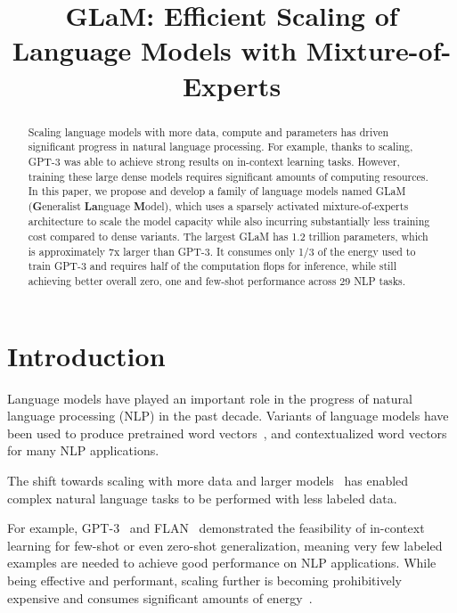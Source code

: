 \title{GLaM: Efficient Scaling of Language Models with Mixture-of-Experts}

\begin{abstract}
Scaling language models with more data, compute and parameters has driven significant progress in natural language processing. For example, thanks to scaling, GPT-3 was able to achieve strong results on in-context learning  tasks. However, training these large dense models requires significant amounts of computing resources. In this paper, we propose and develop a family of language models named GLaM (\textbf{G}eneralist \textbf{La}nguage \textbf{M}odel), which uses a sparsely activated mixture-of-experts architecture to scale the model capacity while also incurring substantially less training cost compared to dense variants. The largest GLaM has 1.2 trillion parameters, which is approximately 7x larger than GPT-3. It consumes only 1/3 of the energy used to train GPT-3 and requires half of the computation flops for inference, while still achieving better overall zero, one and few-shot performance across 29 NLP tasks.
\end{abstract}

\section{Introduction}
\label{sec:intro}

Language models have played an important role in the progress of natural language processing (NLP) in the past decade. Variants of language models have been used to produce pretrained word vectors~\cite{mikolov2013efficient,pennington-glove}, and contextualized word vectors~\cite{peters2018elmo,devlin2018bert} for many NLP applications.

The shift towards scaling with more data and larger models~\cite{shazeer2017outrageously,gpipe19,kaplan2020scaling} has enabled complex natural language tasks to be performed with less labeled data.

For example, GPT-3~\cite{NEURIPS2020_gpt3} and FLAN~\cite{wei2021finetuned} demonstrated the feasibility of in-context learning for few-shot or even zero-shot generalization, meaning very few labeled examples are needed to achieve good performance on NLP applications. While being effective and performant, scaling further is becoming prohibitively expensive and consumes significant amounts of energy~\cite{patterson2021carbon}.

